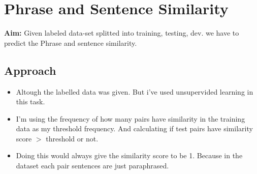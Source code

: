\documentclass{article}
\begin{document}
\section{Phrase and Sentence Similarity}
\textbf{Aim:} Given labeled data-set splitted into training, testing, dev. we have to predict the Phrase and sentence similarity.
\subsection{Approach}
\begin{itemize}
    \item Altough the labelled data was given. But i've used unsupervided learning in this task.
    \item I'm using the frequency of how many pairs have similarity in the training data as my threshold frequency. And calculating if test pairs have similarity score $>$ threshold or not.
    \item Doing this would always give the similarity score to be 1. Because in the dataset{\cite{paws2019naacl}} each pair sentences are just paraphrased.\\
\end{itemize}
\end{document}
